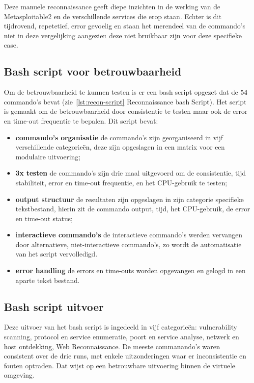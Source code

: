 Deze manuele reconnaissance geeft diepe inzichten in de werking van de Metasploitable2 en de verschillende services die erop staan.
Echter is dit tijdrovend, repetetief, error gevoelig en staan het merendeel van de commando's niet in deze vergelijking aangezien deze niet bruikbaar zijn voor deze specifieke case.

\subsection{Bash script voor betrouwbaarheid}

Om de betrouwbaarheid te kunnen testen is er een bash script opgezet dat de 54 commando's bevat (zie~\ref{lst:recon-script} Reconnaissance bash Script). Het script is gemaakt om de betrouwbaarheid door consistentie te testen maar ook de error en time-out frequentie te bepalen.
Dit script bevat:

\begin{itemize}
  \item \textbf{commando's organisatie} de commando's zijn georganiseerd in vijf verschillende categorieën, deze zijn opgeslagen in een matrix voor een modulaire uitvoering;
  \item \textbf{3x testen} de commando's zijn drie maal uitgevoerd om de consistentie, tijd stabiliteit, error en time-out frequentie, en het CPU-gebruik te testen;
  \item \textbf{output structuur} de resultaten zijn opgeslagen in zijn categorie specifieke tekstbestand, hierin zit de commando output, tijd, het CPU-gebruik, de error en time-out status;
  \item \textbf{interactieve commando's} de interactieve commando's werden vervangen door alternatieve, niet-interactieve commando's, zo wordt de automatisatie van het script vervolledigd. 
  \item \textbf{error handling} de errors en time-outs worden opgevangen en gelogd in een aparte tekst bestand.

\end{itemize}

\subsection{Bash script uitvoer}

Deze uitvoer van het bash script is ingedeeld in vijf categorieën: vulnerability scanning, protocol en service enumeratie, poort en service analyse, netwerk en host ontdekking, Web Reconnaissance.
De meeste commanando's waren consistent over de drie runs, met enkele uitzonderingen waar er inconsistentie en fouten optraden.
Dat wijst op een betrouwbare uitvoering binnen de virtuele omgeving.

